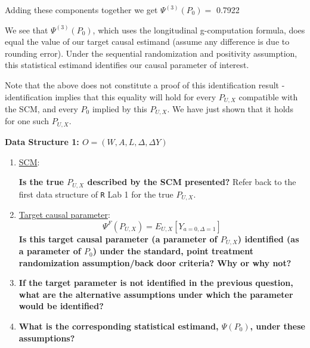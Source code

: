\documentclass{exam}
\newenvironment{packed_item}{
\begin{itemize}
 \setlength{\itemsep}{0pt}
  \setlength{\parskip}{0pt}
  \setlength{\parsep}{0pt}
}{\end{itemize}}
\begin{document}
\begin{solution}
\begin{enumerate}
\begin{enumerate}
Adding these components together we get $\Psi^{(3)}(P_0) = $ 0.7922 
\end{enumerate}

We see that $\Psi^{(3)}(P_0)$, which uses the longitudinal g-computation formula, does equal the value of our target causal estimand (assume any difference is due to rounding error). Under the sequential randomization and positivity assumption, this statistical estimand identifies our causal parameter of interest.

Note that the above does not constitute a proof of this identification result - identification implies that this equality will hold for every $P_{U,X}$ compatible with the SCM, and every $P_0$ implied by this $P_{U,X}$. We have just shown that it holds for one such $P_{U,X}$.

\end{enumerate}
\end{solution}

\pagebreak
\noindent\large\textbf{Data Structure 1: $O = (W, A, L, \Delta, \Delta Y)$}
\normalsize

\begin{enumerate}
\item \underline{SCM}:
\textbf{Is the true $P_{U,X}$ described by the SCM presented?} Refer back to the first data structure of \texttt{R} Lab 1 for the true $P_{U,X}$.
\item \underline{Target causal parameter}:
\[
\Psi^F(P_{U,X}) = E_{U,X}[Y_{a=0, \Delta=1}]
\]
\textbf{Is this target causal parameter (a parameter of $P_{U,X}$) identified (as a parameter of $P_0$) under the standard, point treatment randomization assumption/back door criteria? Why or why not?}
\item \textbf{If the target parameter is not identified in the previous question, what are the alternative assumptions under which the parameter would be identified?} 
\item \textbf{What is the corresponding statistical estimand, $\Psi(P_0)$, under these assumptions?}
\end{enumerate}
\end{document}
